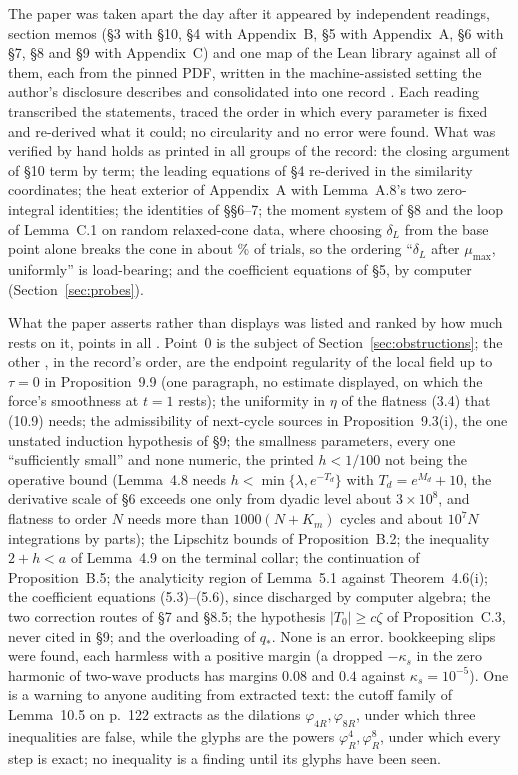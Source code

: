 \documentclass[11pt]{article}
\begin{document}
The paper was taken apart the day after it appeared by \Readers{} independent readings,
\SectionMemos{} section memos (\S3 with \S10, \S4 with Appendix~B, \S5 with Appendix~A,
\S6 with \S7, \S8 and \S9 with Appendix~C) and one map of the Lean library against all of
them, each from the pinned PDF, written in the machine-assisted setting the author's
disclosure describes and consolidated into one record \cite{Records}. Each reading
transcribed the statements, traced the order in which every parameter is fixed and
re-derived what it could; no circularity and no error were found. What was verified by hand holds as printed in all \VerifiedRows{} groups of
the record: the closing argument of \S10 term by term; the leading equations of \S4
re-derived in the similarity coordinates; the heat exterior of Appendix~A with Lemma~A.8's
two zero-integral identities; the identities of \S\S6--7; the moment system of \S8 and the
loop of Lemma~C.1 on \ConeLoopTrials{} random relaxed-cone data, where choosing $\delta_L$
from the base point alone breaks the cone in about \ConeBreakPct\% of trials, so the
ordering ``$\delta_L$ after $\mu_{\max}$, uniformly'' is load-bearing; and the coefficient
equations of \S5, by computer (Section~\ref{sec:probes}).

What the paper asserts rather than displays was listed and ranked by how much rests on it,
\WeakPoints{} points in all \cite{Records}. Point~0 is the subject of
Section~\ref{sec:obstructions}; the other \WeakPointsAfterZero, in the record's order, are
the endpoint regularity of the local field up to $\tau=0$ in Proposition~9.9 (one paragraph,
no estimate displayed, on which the force's smoothness at $t=1$ rests);
the uniformity in $\eta$ of the flatness (3.4) that (10.9) needs; the admissibility of
next-cycle sources in Proposition~9.3(i), the one unstated induction hypothesis of \S9; the
smallness parameters, every one ``sufficiently small'' and none numeric, the printed
$h<1/100$ not being the operative bound (Lemma~4.8 needs $h<\min\{\lambda,e^{-T_d}\}$ with
$T_d=e^{M_d}+10$, the derivative scale of \S6 exceeds one only from dyadic level about
$3\times10^{8}$, and flatness to order $N$ needs more than $1000(N+K_m)$ cycles and about
$10^{7}N$ integrations by parts); the Lipschitz bounds of Proposition~B.2; the inequality
$2+h<a$ of Lemma~4.9 on the terminal collar; the continuation of Proposition~B.5; the
analyticity region of Lemma~5.1 against Theorem~4.6(i); the coefficient equations
(5.3)--(5.6), since discharged by computer algebra; the two correction routes of \S7 and
\S8.5; the hypothesis $|T_0|\ge c\zeta$ of Proposition~C.3, never cited in \S9; and the
overloading of $q_*$. None is an error. \Slips{} bookkeeping slips were found, each
harmless with a positive margin (a dropped $-\kappa_s$ in the zero harmonic of two-wave
products has margins $0.08$ and $0.4$ against $\kappa_s=10^{-5}$). One is a warning to
anyone auditing from extracted text: the cutoff family of Lemma~10.5 on p.~122 extracts as
the dilations $\varphi_{4R},\varphi_{8R}$, under which three inequalities are false, while
the glyphs are the powers $\varphi_R^4,\varphi_R^8$, under which every step is exact; no
inequality is a finding until its glyphs have been seen.
\end{document}
